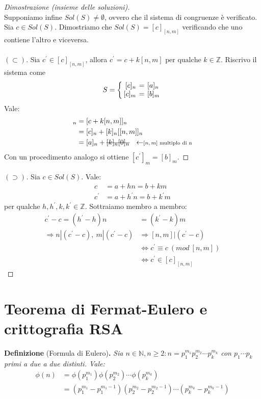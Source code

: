 \documentclass[12pt,twoscolu]{article}
\newcommand{\N}{\mathbb{N}}
\newcommand{\Z}{\mathbb{Z}}
\newcommand{\sesolose}{\Leftrightarrow}
\newcommand{\implica}{\Longrightarrow}
\newcommand{\pr}{\prime}
\newcommand{\pq}{\text{ per qualche }}
\renewcommand\qedsymbol{$\blacksquare$}
\newcommand{\stkout}[1]{\ifmmode\text{\sout{\ensuremath{#1}}}\else\sout{#1}\fi}
\begin{document}
\begin{proof}[Dimostrazione (insieme delle soluzioni)]\ \\
Supponiamo infine $Sol(S) \ne \emptyset$, ovvero che il sistema di congruenze è verificato. Sia $c \in Sol(S)$. Dimostriamo che $Sol(S) = [c]_{[n,m]}$ verificando che uno contiene l'altro e viceversa.
\\\\$(\subset)$.
Sia $ c^{\pr} \in [c]_{[n,m]}$, allora $c^{\pr} = c + k[n,m] \pq k \in \Z$. Riscrivo il sistema come
\[
S = \left\{
\setlength\arraycolsep{2pt}
\begin{array}{rcl} [c]_n & = & [a]_n \\ \relax
 [c]_m & = & [b]_m
\end{array}\right
.
\]
Vale:
\begin{align*}
[c^{\pr}]_n &= [c + k[n,m]]_n \\ 
&= [c]_n + [k]_n [[n,m]]_n \\
&= [a]_n + \stkout{[k]_n [0]_n} \ \ \leftarrow\scriptstyle{ \text{$[n,m]$ multiplo di n}}
\end{align*}
Con un procedimento analogo si ottiene $[c^{\pr}]_m = [b]_m$.
\end{proof}
\renewcommand\qedsymbol{$\blacksquare$}
\begin{proof}[$(\supset)$]
Sia $c \in Sol(S)$. Vale:
\begin{align*}
c &= a+hn = b + km \\
c^{\pr} &= a+h^{\pr}n = b + k^{\pr}m
\end{align*}
per qualche $h, h^{\pr}, k, k^{\pr} \in \Z$. Sottraiamo membro a membro:
\begin{align*}
c^{\pr} - c = (h^{\pr} - h)n &= (k^{\pr} - k)m \\
\implica n | (c^{\pr} -c),\ m|(c^{\pr} - c) &\implica [n, m]|(c^{\pr} - c) \\
&\sesolose c^{\pr} \equiv c \ (mod \ [n, m]) \\
&\sesolose c^{\pr} \in [c]_{[n,m]}
\end{align*}
\end{proof}

\section{Teorema di Fermat-Eulero e crittografia RSA}
\textbf{Definizione} (Formula di Eulero)\textbf{.} \textit{Sia $n \in \N, n \ge 2: n = p^{m_1}_1 p^{m_2}_2 \cdots p^{m_k}_k$ con $p_1 \cdots p_k$ primi a due a due distinti. Vale:
\begin{align*}
\phi(n) &= \phi(p^{m_1}_1)\phi(p^{m_2}_2) \cdots \phi(p^{m_k}_k) \\
&= (p^{m_1}_1 - p^{m_1 - 1}_1) (p^{m_2}_2 - p^{m_2 - 1}_2) \cdots (p^{m_k}_k - p^{m_k - 1}_k)
\end{align*}
}
\end{document}

